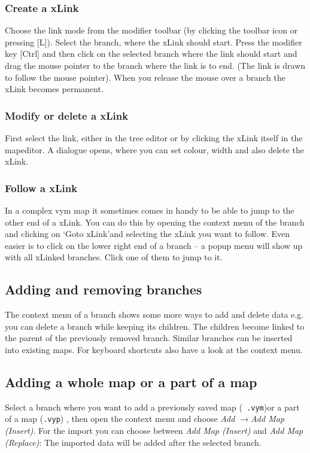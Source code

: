 \documentclass[12pt,a4paper]{article}
\newcommand{\vym}{{\sc vym }}
\newcommand{\ra}{$\longrightarrow$}
\newcommand{\key}[1]{[#1]}
\begin{document}
\subsubsection*{Create a xLink}
Choose the link mode from the modifier toolbar (by clicking the toolbar
icon or pressing \key{L}). Select the branch, where the xLink should
start. Press the modifier key \key{Ctrl} and then click on the selected
branch where the link should start and drag the mouse pointer to the
branch where the link is to end. (The link is drawn to follow the mouse
pointer). When you release the mouse over a branch the xLink becomes
permanent.

\subsubsection*{Modify or delete a xLink}
First select the link, either in the tree editor or by clicking the xLink
itself in the mapeditor.  A dialogue opens, where you can set colour,
width and also delete the xLink.

\subsubsection*{Follow a xLink}
In a complex \vym map it sometimes comes in handy to be able to jump to
the other end of a xLink. You can do this by opening the context menu of
the branch and clicking on \lq Goto xLink\rq and selecting the xLink you
want to follow. Even easier is to click on the lower right end of a
branch -- a popup menu will show up with all xLinked branches. Click one
of them to jump to it.


\subsection{Adding and removing branches}
The context menu of a branch shows some more ways to add and delete data
e.g. you can delete a branch while keeping its children. The children
become linked to the parent of the previously removed branch.  Similar
branches can be inserted into existing maps. For keyboard shortcuts also
have a look at the context menu.

\subsection{Adding a whole map or a part of a map}
Select a branch where you want to add a previously saved map ({\tt
.vym})or a part of a map ({\tt .vyp}) , then open the context menu and
choose {\em Add \ra Add Map (Insert)}. For the import you can choose
between {\em Add Map (Insert)} and {\em Add Map (Replace)}: The imported
data will be added after the selected branch.
\end{document}
